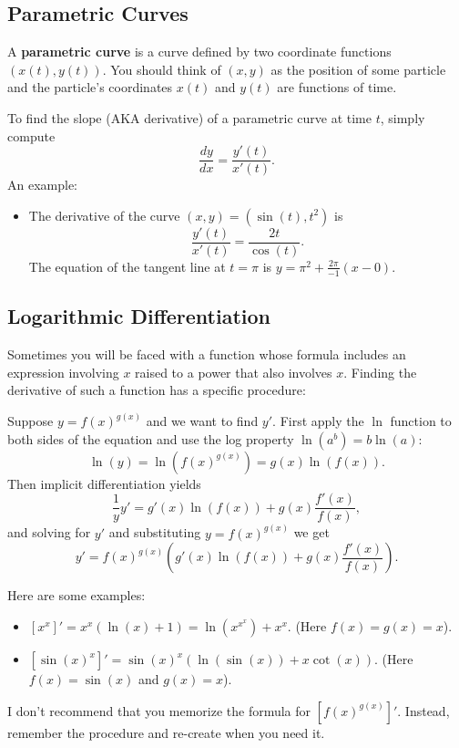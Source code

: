 \subsection{Parametric Curves}

A \textbf{parametric curve} is a curve defined by two coordinate functions $(x(t), y(t))$. You should think of $(x,y)$ as the position of some particle and the particle's coordinates $x(t)$ and $y(t)$ are functions of time.

To find the slope (AKA derivative) of a parametric curve at time $t$, simply compute
$$\frac{dy}{dx}=\frac{y'(t)}{x'(t)}.$$
An example:
\begin{itemize}
    \item The derivative of the curve $(x,y)=(\sin(t), t^2)$ is
    $$\frac{y'(t)}{x'(t)}=\frac{2t}{\cos(t)}.$$
    The equation of the tangent line at $t=\pi$ is $y=\pi^2+\frac{2\pi}{-1}(x-0).$
\end{itemize}

\subsection{Logarithmic Differentiation}

Sometimes you will be faced with a function whose formula includes an expression involving $x$ raised to a power that also involves $x$. Finding the derivative of such a function has a specific procedure:
\begin{strat}
Suppose $y=f(x)^{g(x)}$ and we want to find $y'$. First apply the $\ln$ function to both sides of the equation and use the log property $\ln(a^b)=b\ln(a)$:
$$\ln(y)=\ln(f(x)^{g(x)})=g(x)\ln(f(x)).$$
Then implicit differentiation yields
$$\frac{1}{y}y'=g'(x)\ln(f(x))+g(x)\frac{f'(x)}{f(x)},$$
and solving for $y'$ and substituting $y=f(x)^{g(x)}$ we get
$$y'=f(x)^{g(x)}\left(g'(x)\ln(f(x))+g(x)\frac{f'(x)}{f(x)}\right).$$
\end{strat}

Here are some examples:
\begin{itemize}
\item $[x^x]'=x^x(\ln(x)+1)=\ln(x^{x^x})+x^x$. (Here $f(x)=g(x)=x$).
\item $[\sin(x)^x]'=\sin(x)^x(\ln(\sin(x))+x\cot(x))$. (Here $f(x)=\sin(x)$ and $g(x)=x$). 
\end{itemize}

I don't recommend that you memorize the formula for $[f(x)^{g(x)}]'$. Instead, remember the procedure and re-create when you need it.

